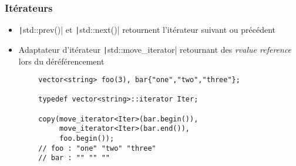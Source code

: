 \documentclass[C++.tex]{subfiles}
\begin{document}
\begin{frame}[fragile]
	\frametitle{Itérateurs}
	\begin{itemize}
		\item \texttt|std::prev()| et \texttt|std::next()| retournent l'itérateur suivant ou précédent
		\item Adaptateur d'itérateur \texttt|std::move_iterator| retournant des \textit{rvalue reference} lors du déréférencement
	\end{itemize}

	\begin{verbatim}
		vector<string> foo(3), bar{"one","two","three"};

		typedef vector<string>::iterator Iter;

		copy(move_iterator<Iter>(bar.begin()),
		     move_iterator<Iter>(bar.end()),
		     foo.begin());
		// foo : "one" "two" "three"
		// bar : "" "" ""
	\end{verbatim}

\end{frame}
\end{document}
